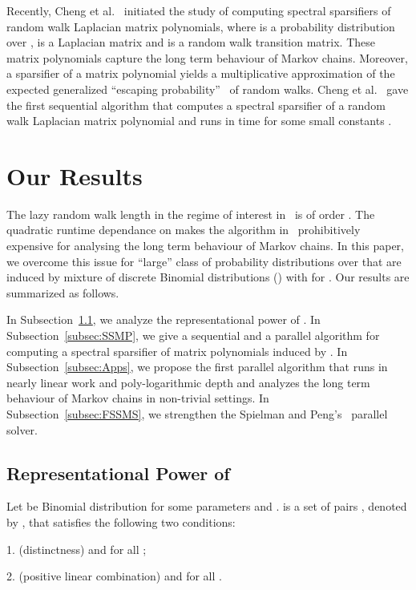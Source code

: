 \documentclass[11pt]{article}
\numberwithin{thm}{section}
\begin{document}
Recently, Cheng et al.~\cite{CCLPT15} initiated the study of computing spectral sparsifiers  of random walk Laplacian matrix polynomials, where  is a probability distribution over ,  is a Laplacian matrix and  is a random walk transition matrix. These matrix polynomials capture the long term behaviour of Markov chains. Moreover, a sparsifier of a matrix polynomial yields a multiplicative approximation of the expected generalized ``escaping probability''~\cite{OT12,KS14} of random walks. Cheng et al.~\cite{CCLPT15} gave the first sequential algorithm that computes a spectral sparsifier of a random walk Laplacian matrix polynomial and runs in time  for some small constants .



\section{Our Results}

The lazy random walk length  in the regime of interest in~\cite{SJ89,ACL06,OT12} is of order . The quadratic runtime dependance on  makes the algorithm in~\cite{CCLPT15} prohibitively expensive for analysing the long term behaviour of Markov chains. In this paper, we overcome this issue for ``large'' class of probability distributions  over  that are induced by mixture of discrete Binomial distributions () with  for . Our results are summarized as follows.

In Subsection~\ref{subsec:RPMDBD}, we analyze the representational power of . In Subsection~\ref{subsec:SSMP}, we give a sequential and a parallel algorithm for computing a spectral sparsifier of matrix polynomials induced by . In Subsection~\ref{subsec:Apps}, we propose the first parallel algorithm that runs in nearly linear work and poly-logarithmic depth and analyzes the long term behaviour of Markov chains in non-trivial settings. In Subsection~\ref{subsec:FSSMS}, we strengthen the Spielman and Peng's~\cite{PS14} parallel  solver.


\subsection{Representational Power of }\label{subsec:RPMDBD}

Let  be Binomial distribution for some parameters  and .  is a set of pairs , denoted by , that satisfies the following two conditions:

1. (distinctness)  and  for all ;

2. (positive linear combination)  and  for all .
\end{document}
